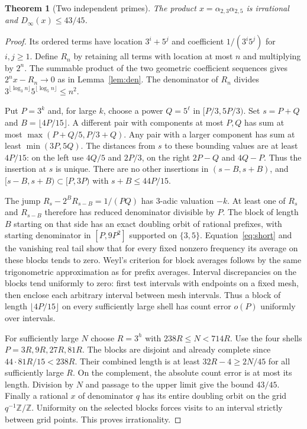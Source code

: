 \documentclass[11pt]{article}
\newtheorem{theorem}{Theorem}
\newcommand{\Z}{\mathbb Z}
\begin{document}
\begin{theorem}[Two independent primes]\label{thm:mixed}
The product $x=\alpha_{2,3}\alpha_{2,5}$ is irrational and $D_\infty(x)\le43/45$.
\end{theorem}
\begin{proof}
Its ordered terms have location $3^i+5^j$ and coefficient $1/(3^i5^j)$ for $i,j\ge1$.
Define $R_n$ by retaining all terms with location at most $n$ and multiplying by $2^n$.
The summable product of the two geometric coefficient sequences gives $2^nx-R_n\to0$
as in Lemma~\ref{lem:den}. The denominator of $R_n$ divides
$3^{\lfloor\log_3 n\rfloor}5^{\lfloor\log_5 n\rfloor}\le n^2$.

Put $P=3^k$ and, for large $k$, choose a power $Q=5^\ell$ in $[P/3,5P/3)$.
Set $s=P+Q$ and $B=\lfloor4P/15\rfloor$. A different pair with components
at most $P,Q$ has sum at most $\max(P+Q/5,P/3+Q)$.
Any pair with a larger component has sum at least $\min(3P,5Q)$.
The distances from $s$ to these bounding values are at least $4P/15$:
on the left use $4Q/5$ and $2P/3$, on the right $2P-Q$ and $4Q-P$.
Thus the insertion at $s$ is unique. There are no other insertions in
$(s-B,s+B)$, and $[s-B,s+B)\subset[P,3P)$ with $s+B\le44P/15$.

The jump $R_s-2^B R_{s-B}=1/(PQ)$ has $3$-adic valuation $-k$.
At least one of $R_s$ and $R_{s-B}$ therefore has reduced denominator divisible by $P$.
The block of length $B$ starting on that side has an exact doubling orbit of rational
prefixes, with starting denominator in $[P,9P^2]$ supported on $\{3,5\}$.
Equation~\eqref{eq:short} and the vanishing real tail show that for every fixed nonzero
frequency its average on these blocks tends to zero. Weyl's criterion for block averages
follows by the same trigonometric approximation as for prefix averages.
Interval discrepancies on the blocks tend uniformly to zero: first test intervals with
endpoints on a fixed mesh, then enclose each arbitrary interval between mesh intervals.
Thus a block of length $\lfloor4P/15\rfloor$ on every sufficiently large shell has
count error $o(P)$ uniformly over intervals.

For sufficiently large $N$ choose $R=3^h$ with $238R\le N<714R$.
Use the four shells $P=3R,9R,27R,81R$. The blocks are disjoint and already complete
since $44\cdot81R/15<238R$. Their combined length is at least
$32R-4\ge 2N/45$ for all sufficiently large $R$. On the complement, the absolute
count error is at most its length. Division by $N$ and passage to the upper limit
give the bound $43/45$. Finally a rational $x$ of denominator $q$ has its entire
doubling orbit on the grid $q^{-1}\Z/\Z$. Uniformity on the selected blocks forces
visits to an interval strictly between grid points. This proves irrationality.
\end{proof}
\end{document}
